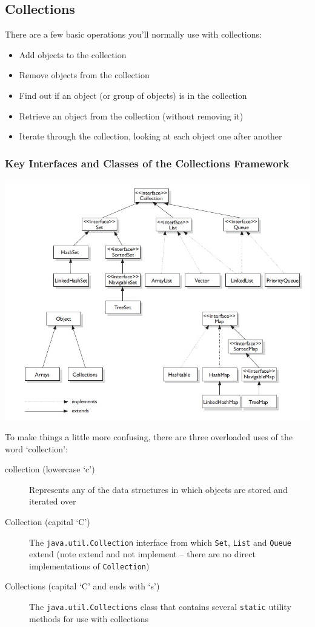 \subsection{Collections}
There are a few basic operations you'll normally use with collections:
\begin{itemize}
    \item Add objects to the collection
    \item Remove objects from the collection
    \item Find out if an object (or group of objects) is in the collection
    \item Retrieve an object from the collection (without removing it)
    \item Iterate through the collection, looking at each object one after 
    another
\end{itemize}

\subsubsection{Key Interfaces and Classes of the Collections Framework}
\begin{center}
\includegraphics[scale=0.5]{Images/collections_hierarchy}
\end{center}

To make things a little more confusing, there are three overloaded uses of the 
word `collection':
\begin{description}
    \item[collection (lowercase `c')] Represents any of the data structures in 
    which objects are stored and iterated over
    \item[Collection (capital `C')] The \verb#java.util.Collection# interface 
    from which \verb#Set#, \verb#List# and \verb#Queue# extend (note extend and 
    not implement -- there are no direct implementations of \verb#Collection#)
    \item[Collections (capital `C' and ends with `s')] The 
    \verb#java.util.Collections# class that contains several \verb#static# 
    utility methods for use with collections
\end{description}

